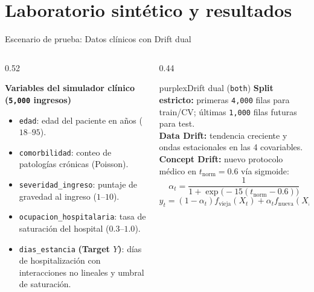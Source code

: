 \documentclass[aspectratio=169,11pt,table]{beamer}
\begin{document}
\section{Laboratorio sintético y resultados}

\begin{frame}{Escenario de prueba: Datos clínicos con Drift dual}
\begin{columns}[T,onlytextwidth]
\begin{column}{0.52\textwidth}
\begin{ccdebox}
\scriptsize
\textbf{Variables del simulador clínico (\texttt{5,000} ingresos)}\\[0.08cm]
\begin{itemize}
  \item \texttt{edad}: edad del paciente en años ($18$--$95$).
  \item \texttt{comorbilidad}: conteo de patologías crónicas (Poisson).
  \item \texttt{severidad\_ingreso}: puntaje de gravedad al ingreso ($1$--$10$).
  \item \texttt{ocupacion\_hospitalaria}: tasa de saturación del hospital ($0.3$--$1.0$).
  \item \texttt{dias\_estancia} \textbf{(Target $Y$)}: días de hospitalización con interacciones no lineales y umbral de saturación.
\end{itemize}
\end{ccdebox}
\end{column}
\begin{column}{0.44\textwidth}
\begin{contrastbox}{purplex}{Drift dual (\texttt{both})}
\scriptsize
\textbf{Split estricto:} primeras \texttt{4,000} filas para train/CV; últimas \texttt{1,000} filas futuras para test.\\[0.10cm]
\textbf{Data Drift:} tendencia creciente y ondas estacionales en las 4 covariables.\\[0.10cm]
\textbf{Concept Drift:} nuevo protocolo médico en $t_{\text{norm}} = 0.6$ vía sigmoide:
\[\alpha_t = \frac{1}{1 + \exp\big(-15(t_{\text{norm}} - 0.6)\big)}\]
\[y_t = (1 - \alpha_t) f_{\text{vieja}}(X_t) + \alpha_t f_{\text{nueva}}(X_t) + \epsilon_t\]
\end{contrastbox}
\end{column}
\end{columns}
\end{frame}
\end{document}

